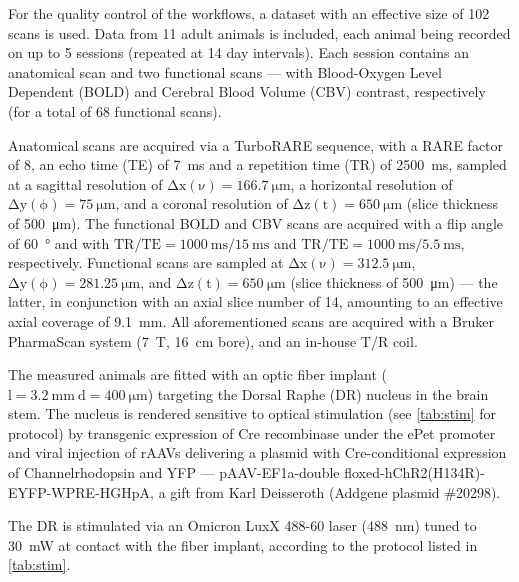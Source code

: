 For the quality control of the workflows, a dataset with an effective size of 102 scans is used.
Data from 11 adult animals is included, each animal being recorded on up to 5 sessions (repeated at 14 day intervals).
Each session contains an anatomical scan and two functional scans --- with Blood-Oxygen Level Dependent (BOLD) and Cerebral Blood Volume (CBV) contrast, respectively (for a total of 68 functional scans).

Anatomical scans are acquired via a TurboRARE sequence, with a RARE factor of 8, an echo time (TE) of \SI{7}{\milli\second} and a repetition time (TR) of \SI{2500}{\milli\second}, sampled at a sagittal resolution of $\mathrm{\Delta x(\nu)=\SI{166.7}{\micro\meter}}$, a horizontal resolution of $\mathrm{\Delta y(\phi)=\SI{75}{\micro\meter}}$, and a coronal resolution of $\mathrm{\Delta z(t)=\SI{650}{\micro\meter}}$ (slice thickness of \SI{500}{\micro\meter}).
The functional BOLD and CBV scans are acquired with a flip angle of \SI{60}{\degree} and with $\mathrm{TR/TE = \SI{1000}{\milli\second}/\SI{15}{\milli\second}}$ and $\mathrm{TR/TE = \SI{1000}{\milli\second}/\SI{5.5}{\milli\second}}$, respectively.
Functional scans are sampled at $\mathrm{\Delta x(\nu)=\SI{312.5}{\micro\meter}}$, $\mathrm{\Delta y(\phi)=\SI{281.25}{\micro\meter}}$, and $\mathrm{\Delta z(t)=\SI{650}{\micro\meter}}$ (slice thickness of \SI{500}{\micro\meter}) --- the latter, in conjunction with an axial slice number of 14, amounting to an effective axial coverage of \SI{9.1}{\milli\meter}.
All aforementioned scans are acquired with a Bruker PharmaScan system (\SI{7}{\tesla}, \SI{16}{\centi\meter} bore), and an in-house T/R coil.

The measured animals are fitted with an optic fiber implant ($\mathrm{l=\SI{3.2}{\milli\meter} \ d=\SI{400}{\micro\meter}}$) targeting the Dorsal Raphe (DR) nucleus in the brain stem.
The nucleus is rendered sensitive to optical stimulation (see \cref{tab:stim} for protocol) by transgenic expression of Cre recombinase under the ePet promoter \cite{Scott2005} and viral injection of rAAVs delivering a plasmid with Cre-conditional expression of Channelrhodopsin and YFP ---
pAAV-EF1a-double floxed-hChR2(H134R)-EYFP-WPRE-HGHpA, a gift from Karl Deisseroth (Addgene plasmid \#20298).

The DR is stimulated via an Omicron LuxX 488-60 laser (\SI{488}{\nano\meter}) tuned to \SI{30}{\milli\watt} at contact with the fiber implant, according to the protocol listed in \cref{tab:stim}.
